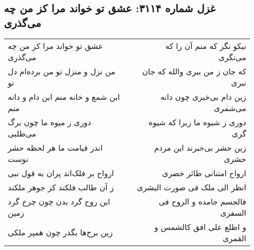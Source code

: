 \begin{center}
\section*{غزل شماره ۳۱۱۴: عشق تو خواند مرا کز من چه می‌گذری}
\label{sec:3114}
\begin{longtable}{l p{0.5cm} r}
عشق تو خواند مرا کز من چه می‌گذری
&&
نیکو نگر که منم آن را که می‌نگری
\\
من نزل و منزل تو من برده‌ام دل تو
&&
که جان ز من ببری والله که جان نبری
\\
این شمع و خانه منم این دام و دانه منم
&&
زین دام بی‌خبری چون دانه می‌شمری
\\
دوری ز میوه ما چون برگ می‌طلبی
&&
دوری ز شیوه ما زیرا که شیوه گری
\\
اندر قیامت ما هر لحظه حشر نوست
&&
زین حشر بی‌خبرند این مردم حشری
\\
ارواح بر فلک‌اند پران به قول نبی
&&
ارواح امتنانی طائر خضری
\\
ز آن طالب فلکند کز جوهر ملکند
&&
انظر الی ملک فی صورت البشری
\\
این روح گرد بدن چون چرخ گرد زمین
&&
فالجسم جامده و الروح فی السفری
\\
زین برج‌ها بگذر چون همپر ملکی
&&
و اطلع علی افق کالشمس و القمری
\\
\end{longtable}
\end{center}
